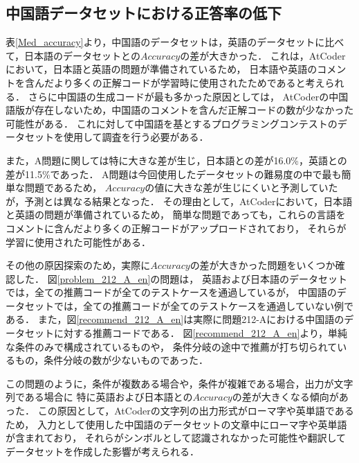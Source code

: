   \subsection{中国語データセットにおける正答率の低下}
  表\ref{Med_accuracy}より，中国語のデータセットは，英語のデータセットに比べて，日本語のデータセットとの$Accuracy$の差が大きかった．
  これは，AtCoder\cite{AtCoder}において，日本語と英語の問題が準備されているため，
  日本語や英語のコメントを含んだより多くの正解コードが学習時に使用されたためであると考えられる．
  さらに中国語の生成コードが最も多かった原因としては，
  AtCoderの中国語版が存在しないため，中国語のコメントを含んだ正解コードの数が少なかった可能性がある．
  これに対して中国語を基とするプログラミングコンテストのデータセットを使用して調査を行う必要がある．
  
  また，A問題に関しては特に大きな差が生じ，日本語との差が16.0\%，英語との差が11.5\%であった．
  A問題は今回使用したデータセットの難易度の中で最も簡単な問題であるため，
  $Accuracy$の値に大きな差が生じにくいと予測していたが，予測とは異なる結果となった．
  その理由として，AtCoder\cite{AtCoder}において，日本語と英語の問題が準備されているため，
  簡単な問題であっても，これらの言語をコメントに含んだより多くの正解コードがアップロードされており，
  それらが学習に使用された可能性がある．

  その他の原因探索のため，実際に$Accuracy$の差が大きかった問題をいくつか確認した．
  図\ref{problem_212_A_en}の問題は，
  英語および日本語のデータセットでは，全ての推薦コードが全てのテストケースを通過しているが，
  中国語のデータセットでは，全ての推薦コードが全てのテストケースを通過していない例である．
  また，図\ref{recommend_212_A_en}は実際に問題212-Aにおける中国語のデータセットに対する推薦コードである．
  図\ref{recommend_212_A_en}より，単純な条件のみで構成されているものや，
  条件分岐の途中で推薦が打ち切られているもの，条件分岐の数が少ないものであった．
  
  この問題のように，条件が複数ある場合や，条件が複雑である場合，出力が文字列である場合に
  特に英語および日本語との$Accuracy$の差が大きくなる傾向があった．
  この原因として，AtCoderの文字列の出力形式がローマ字や英単語であるため，
  入力として使用した中国語のデータセットの文章中にローマ字や英単語が含まれており，
  それらがシンボルとして認識されなかった可能性や翻訳してデータセットを作成した影響が考えられる．
